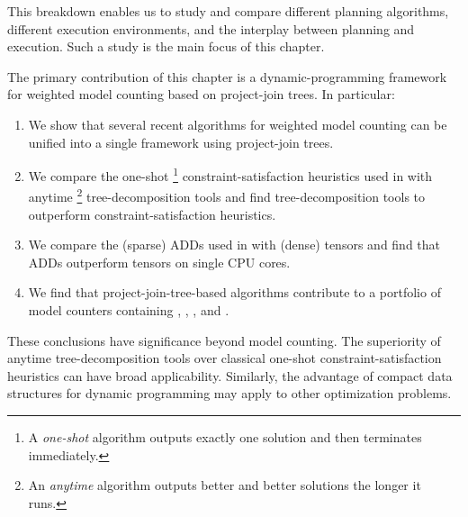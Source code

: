 This breakdown enables us to study and compare different planning algorithms, different execution environments, and the interplay between planning and execution.
Such a study is the main focus of this chapter. %

The primary contribution of this chapter is a dynamic-programming framework for weighted model counting based on project-join trees.
In particular:
\begin{enumerate}
    \item We show that several recent algorithms for weighted model counting \cite{DPV20,fichte2020exploiting} can be unified into a single framework using project-join trees.
    \item We compare the one-shot%
    \footnote{A \emph{one-shot} algorithm outputs exactly one solution and then terminates immediately.}
    constraint-satisfaction heuristics \cite{dechter03} used in \cite{DPV20} with anytime%
    \footnote{An \emph{anytime} algorithm outputs better and better solutions the longer it runs.} tree-decomposition tools \cite{MPPV04,AMW17,HS18,Tamaki17} and find tree-decomposition tools to outperform constraint-satisfaction heuristics. %
    \item We compare the (sparse) ADDs \cite{bahar1997algebraic} used in \cite{DPV20} with (dense) tensors \cite{KKCLA17} and find that ADDs outperform tensors on single CPU cores.
    \item We find that project-join-tree-based algorithms contribute to a portfolio of model counters containing \cachet{} \cite{sang2004combining}, \ctd{} \cite{darwiche2004new}, \df{} \cite{LM17}, and \minictd{} \cite{OD15}.
\end{enumerate}
These conclusions have significance beyond model counting.
The superiority of anytime tree-decomposition tools over classical one-shot constraint-satisfaction heuristics can have broad applicability.
Similarly, the advantage of compact data structures for dynamic programming may apply to other optimization problems.

